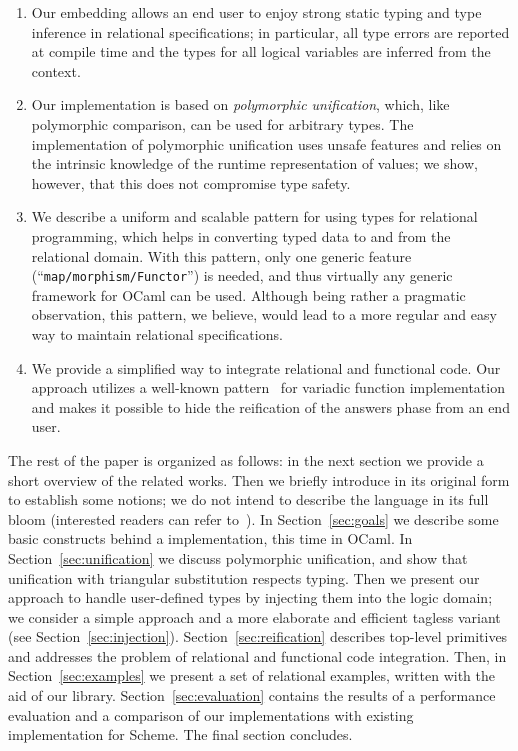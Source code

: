 \begin{enumerate}
\item Our embedding allows an end user to enjoy strong static typing and type inference in relational
specifications; in particular, all type errors are reported at compile time and the types for
all logical variables are inferred from the context.

\item Our implementation is based on \emph{polymorphic unification}, which, like polymorphic comparison,
can be used for arbitrary types. The implementation of polymorphic unification uses unsafe features and
relies on the intrinsic knowledge of the runtime representation of values; we show, however, that this does not
compromise type safety.

\item We describe a uniform and scalable pattern for using types for relational programming, which
helps in converting typed data to and from the relational domain. With this pattern, only one
generic feature (``\lstinline{map/morphism/Functor}'') is needed, and thus virtually any generic 
framework for OCaml can be used. Although being rather a pragmatic observation, this pattern, we
believe, would lead to a more regular and easy way to maintain relational specifications.

\item We provide a simplified way to integrate relational and functional code. Our approach utilizes
a well-known pattern~\cite{Unparsing, DoWeNeed} for variadic function implementation and makes it
possible to hide the reification of the answers phase from an end user.
\end{enumerate}

The rest of the paper is organized as follows: in the next section we provide a short overview of the related
works. Then we briefly introduce \miniKanren in
its original form to establish some notions; we do not intend to describe the language in its full bloom (interested readers can
refer to~\cite{TRS}). In Section~\ref{sec:goals} we describe some basic constructs behind a \miniKanren implementation, this time 
in OCaml. In Section~\ref{sec:unification} we discuss polymorphic unification, and show that unification with 
triangular substitution respects typing. Then we present our approach to handle user-defined types by injecting them 
into the logic domain; we consider a simple approach and a more elaborate and efficient tagless variant (see Section~\ref{sec:injection}). 
Section~\ref{sec:reification} describes top-level primitives and addresses the problem of relational and functional code integration. 
Then, in Section~\ref{sec:examples} we present a set of relational examples, written with the aid of our 
library. Section~\ref{sec:evaluation} contains the results of a performance evaluation and a comparison of our implementations 
with existing implementation for Scheme. The final section concludes.

